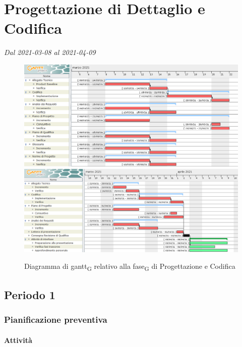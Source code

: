 \section{Progettazione di Dettaglio e Codifica}
\textit{Dal 2021-03-08 al 2021-04-09}

\begin{figure}[H]
	\centering
	\includegraphics[scale=0.52]{res/images/04_gantt_codifica_obbligatori.png}
	\includegraphics[scale=0.48]{res/images/05_gantt_codifica_desiderabili.png}
	\caption{Diagramma di gantt\textsubscript{G} relativo alla fase\textsubscript{G} di Progettazione  e Codifica}
\end{figure}


\subsection{Periodo 1}

\subsubsection{Pianificazione preventiva}

\paragraph{Attività}

\planningTable{
	
}

